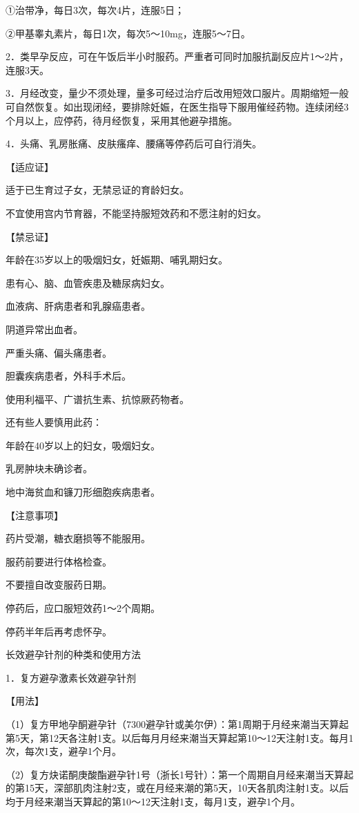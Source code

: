 \documentclass[12pt,UTF8,openany]{ctexbook}
\begin{document}
①治带净，每日3次，每次4片，连服5日；

②甲基睾丸素片，每日1次，每次5～10mg，连服5～7日。

2．类早孕反应，可在午饭后半小时服药。严重者可同时加服抗副反应片1～2片，连服3天。

3．月经改变，量少不须处理，量多可经过治疗后改用短效口服片。周期缩短一般可自然恢复。如出现闭经，要排除妊娠，在医生指导下服用催经药物。连续闭经3个月以上，应停药，待月经恢复，采用其他避孕措施。

4．头痛、乳房胀痛、皮肤瘙痒、腰痛等停药后可自行消失。

【适应证】

适于已生育过子女，无禁忌证的育龄妇女。

不宜使用宫内节育器，不能坚持服短效药和不愿注射的妇女。

【禁忌证】

年龄在35岁以上的吸烟妇女，妊娠期、哺乳期妇女。

患有心、脑、血管疾患及糖尿病妇女。

血液病、肝病患者和乳腺癌患者。

阴道异常出血者。

严重头痛、偏头痛患者。

胆囊疾病患者，外科手术后。

使用利福平、广谱抗生素、抗惊厥药物者。

还有些人要慎用此药：

年龄在40岁以上的妇女，吸烟妇女。

乳房肿块未确诊者。

地中海贫血和镰刀形细胞疾病患者。

【注意事项】

药片受潮，糖衣磨损等不能服用。

服药前要进行体格检查。

不要擅自改变服药日期。

停药后，应口服短效药1～2个周期。

停药半年后再考虑怀孕。





长效避孕针剂的种类和使用方法


1．复方避孕激素长效避孕针剂

【用法】

（1）复方甲地孕酮避孕针（7300避孕针或美尔伊）：第1周期于月经来潮当天算起第5天，第12天各注射1支。以后每月月经来潮当天算起第10～12天注射1支。每月1次，每次1支，避孕1个月。

（2）复方炔诺酮庚酸酯避孕针1号（浙长1号针）：第一个周期自月经来潮当天算起的第15天，深部肌肉注射2支，或在月经来潮的第5天，10天各肌肉注射1支。以后均于月经来潮当天算起的第10～12天注射1支，每月1支，避孕1个月。
\end{document}
